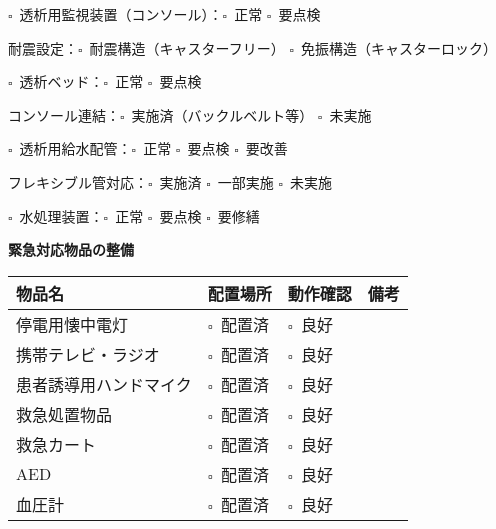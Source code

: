\documentclass[a4paper,12pt]{jarticle}
\newcommand{\checkbox}{$\square$\ }
\begin{document}
\noindent
\checkbox 透析用監視装置（コンソール）：\checkbox 正常 \quad \checkbox 要点検

\vspace{2mm}

\noindent
耐震設定：\checkbox 耐震構造（キャスターフリー） \quad \checkbox 免振構造（キャスターロック）

\vspace{3mm}

\noindent
\checkbox 透析ベッド：\checkbox 正常 \quad \checkbox 要点検

\vspace{2mm}

\noindent
コンソール連結：\checkbox 実施済（バックルベルト等） \quad \checkbox 未実施

\vspace{3mm}

\noindent
\checkbox 透析用給水配管：\checkbox 正常 \quad \checkbox 要点検 \quad \checkbox 要改善

\vspace{2mm}

\noindent
フレキシブル管対応：\checkbox 実施済 \quad \checkbox 一部実施 \quad \checkbox 未実施

\vspace{3mm}

\noindent
\checkbox 水処理装置：\checkbox 正常 \quad \checkbox 要点検 \quad \checkbox 要修繕

\vspace{8mm}

\begin{center}
\textbf{\large 緊急対応物品の整備}
\end{center}

\vspace{3mm}

\begin{longtable}{|p{4cm}|p{2cm}|p{2cm}|p{3cm}|}
\hline
\textbf{物品名} & \textbf{配置場所} & \textbf{動作確認} & \textbf{備考} \\
\hline
停電用懐中電灯 & \checkbox 配置済 & \checkbox 良好 & \\[0.5cm]
\hline
携帯テレビ・ラジオ & \checkbox 配置済 & \checkbox 良好 & \\[0.5cm]
\hline
患者誘導用ハンドマイク & \checkbox 配置済 & \checkbox 良好 & \\[0.5cm]
\hline
救急処置物品 & \checkbox 配置済 & \checkbox 良好 & \\[0.5cm]
\hline
救急カート & \checkbox 配置済 & \checkbox 良好 & \\[0.5cm]
\hline
AED & \checkbox 配置済 & \checkbox 良好 & \\[0.5cm]
\hline
血圧計 & \checkbox 配置済 & \checkbox 良好 & \\[0.5cm]
\hline
\end{longtable}
\end{document}
